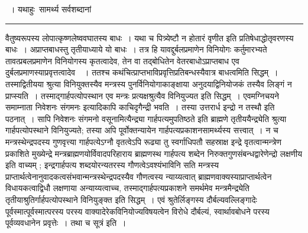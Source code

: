 \documentclass[11pt, openany]{book}
\begin{document}
{~। यथाहुः\textendash\ {\qtl सामर्थ्य सर्वशब्दानां}}\\
\hrule
\vspace{3mm}
\noindent
वैतुष्यरूपस्य लोपात्कृष्णलेष्ववघातस्य बाधः~। यथा च पित्र्येष्टौ {\qt न होतारं वृणीत} इति प्रतिषेधाद्धोतृवरणस्य बाधः~। अप्राप्तबाधस्तु तृतीयाध्याये यो बाधः~। तत्र हि यावद्दुर्बलप्रमाणेन विनियोगः कर्तुमारभ्यते तावत्प्रबलप्रमाणेन विनियोगस्य कृतत्वादेव, तेन वा तद्बोधितेन वेतरबाधोऽप्राप्तबाध एव दुर्बलप्रमाणस्याप्रवृत्तत्वादेव\footnotemark~~। ततश्च कथंचित्प्राप्तभाविप्रवृत्तिप्रतिबन्धस्यैवात्र बाधत्वमिति सिद्धम्~। तस्माद्वितीयया श्रुत्या विनियुक्तस्यैव मन्त्रस्य पुनर्विनियोगाकाङ्क्षाया अनुदयाद्विनियोजकं तस्यैव लिङ्गं न प्राप्स्यति~। तस्माद्गार्हपत्योपस्थान एव मन्त्रः प्रत्यक्षश्रुत्यैव विनियुज्यत इति सिद्धम्~। एवमग्निचयने समाम्नाता {\qt निवेशनः संगमनः} इत्यादिकापि काचिदृगैन्द्री भवति~। तस्या उत्तरार्ध {\qt इन्द्रो न तस्थौ} इति पठनात्~। सापि {\qt निवेशनः संगमनो वसूनामित्यैन्द्र्या गार्हपत्यमुपतिष्ठते} इति ब्राह्मणे तृतीययैन्द्र्येति श्रुत्या गार्हपत्योपस्थाने विनियुज्यते; तस्या अपि पूर्वोक्तन्यायेन गार्हपत्यप्रकाशनसामर्थ्यस्य सत्त्वात्~। न च मन्त्रस्थेन्द्रपदस्य गुणवृत्त्या गार्हपत्येऽग्नौ वृतत्वेऽपि रूढ्या तु स्वर्गाधिपतौ सहस्राक्ष इन्द्रे वृतत्वान्मन्त्रेण प्रकाशिते मुख्येन्द्रे मन्त्रब्राह्मणयोर्विवादपरिहाराय ब्राह्मणस्थ {\qt गार्हपत्य} शब्देन निरुक्तगुणसंबन्धद्वारेणेन्द्रो लक्षणीय इति वाच्यम् ; {\qt इन्द्रगार्हपत्य} शब्दयोरन्यतरस्य गौणत्वेऽवश्यंभाविनि सति मन्त्रस्य प्राप्तार्थत्वेनानुवादकत्वसंभवान्मन्त्रस्थेन्द्रपदस्यैव गौणत्वस्य न्याय्यत्वात् ब्राह्मणवाक्यस्याप्राप्तार्थत्वेन विधायकत्वाद्विधौ लक्षणाया अन्याय्यत्वाच्च, तस्माद्गार्हपत्यप्रकाशने समर्थमेव मन्त्रमैन्द्र्येति तृतीयाश्रुतिर्गार्हपत्योपस्थाने विनियुङ्क्त इति
सिद्धम्~। एवं श्रुतेर्लिङ्गस्य दौर्बल्यवल्लिङ्गादेः पूर्वस्मात्पूर्वस्मात्परस्य परस्य वाक्यादेरेकविनियोज्यविषयत्वेन विरोधे दौर्बल्यं, स्वार्थावबोधने परस्य पूर्वव्यवधानेन प्रवृत्तेः~। तथा च
सूत्रं इति~।\\
\end{document}
